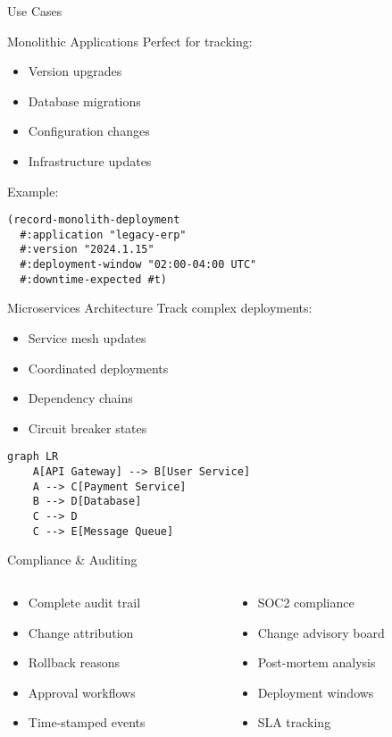 \documentclass[presentation,aspectratio=169]{beamer}
\begin{document}
\begin{frame}[label={sec:orgb4abe2c},fragile]{Use Cases}
 \begin{block}{Monolithic Applications}
Perfect for tracking:
\begin{itemize}
\item Version upgrades
\item Database migrations
\item Configuration changes
\item Infrastructure updates
\end{itemize}

Example:
\begin{verbatim}
(record-monolith-deployment
  #:application "legacy-erp"
  #:version "2024.1.15"
  #:deployment-window "02:00-04:00 UTC"
  #:downtime-expected #t)
\end{verbatim}
\end{block}
\begin{block}{Microservices Architecture}
Track complex deployments:
\begin{itemize}
\item Service mesh updates
\item Coordinated deployments
\item Dependency chains
\item Circuit breaker states
\end{itemize}

\begin{verbatim}
graph LR
    A[API Gateway] --> B[User Service]
    A --> C[Payment Service]
    B --> D[Database]
    C --> D
    C --> E[Message Queue]
\end{verbatim}
\end{block}
\begin{block}{Compliance \& Auditing}
\begin{columns}
\begin{column}{0.5\columnwidth}
\begin{itemize}
\item Complete audit trail
\item Change attribution
\item Rollback reasons
\item Approval workflows
\item Time-stamped events
\end{itemize}
\end{column}
\begin{column}{0.5\columnwidth}
\begin{itemize}
\item SOC2 compliance
\item Change advisory board
\item Post-mortem analysis
\item Deployment windows
\item SLA tracking
\end{itemize}
\end{column}
\end{columns}
\end{block}
\end{frame}
\end{document}
